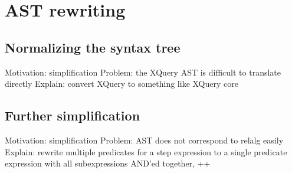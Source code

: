 \section{AST rewriting}
\subsection{Normalizing the syntax tree}
Motivation: simplification
Problem: the XQuery AST is difficult to translate directly
Explain: convert XQuery to something like XQuery core

\subsection{Further simplification}
Motivation: simplification
Problem: AST does not correspond to relalg easily
Explain: rewrite multiple predicates for a step expression to a single 
         predicate expression with all subexpressions AND'ed together, ++